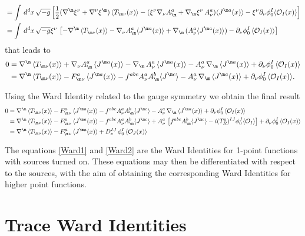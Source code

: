 \documentclass[a4paper,11pt,openright,twoside]{book}
\let\n=\nu      \let\x=\xi     \let\p=\pi      \let\r=\rho
\newcommand{\sdfrac}[2]{\mbox{\small$\displaystyle\frac{#1}{#2}$}}
\numberwithin{equation}{section}
\begin{document}
{{\begin{align}
	&=\int\,d^dx\,\sqrt{-g}\left[\sdfrac{1}{2}(\nabla^\m\x^\n+\nabla^\n\x^\m)\,\langle T_{\m\n}(x)\rangle-(\x^\n\nabla_\n A_\m^a+\nabla_\m\x^\n\,A_\n^a)\langle J^{\m a}(x)\rangle-\x^\n\partial_\n\phi_0^I\langle \mathcal{O}_I(x)\rangle\right]\notag\\
	&=\int\,d^dx\,\sqrt{-g}\x^\n\,\left[-\nabla^\m\,\langle T_{\m\n}(x)\rangle-\nabla_\n A_\m^a\langle J^{\m a}(x)\rangle+\nabla_\m\,(A_\n^a\langle J^{\m a}(x)\rangle)-\partial_\n\phi_0^I\,\langle \mathcal{O}_I(x)\rangle\right]
\end{align}
that leads to 
\begin{align}
	0&=\nabla^\m\,\langle T_{\m\n}(x)\rangle+\nabla_\n A_\m^a\,\langle J^{\m a}(x)\rangle-\nabla_\m\,A_\n^a\,\langle J^{\m a}(x)\rangle-A_\n^a\,\nabla_\m\,\langle J^{\m a}(x)\rangle+\partial_\n\phi_0^I\,\langle \mathcal{O}_I(x)\rangle\notag\\
	&=\nabla^\m\,\langle T_{\m\n}(x)\rangle-F_{\m\n}^a\,\langle J^{\m a}(x)\rangle-f^{abc}A_\n^a A_\m^b\langle J^{\m c}\rangle-A_\n^a\,\nabla_\m\,\langle J^{\m a}(x)\rangle+\partial_\n\phi_0^I\,\langle \mathcal{O}_I(x)\rangle.\label{Ward2}
\end{align}

Using the Ward Identity related to the gauge symmetry we obtain the final result 
\begin{align}
	0&=\nabla^\m\,\langle T_{\m\n}(x)\rangle-F_{\m\n}^a\,\langle J^{\m a}(x)\rangle-f^{abc}A_\n^a A_\m^b\langle J^{\m c}\rangle-A_\n^a\,\nabla_\m\,\langle J^{\m a}(x)\rangle+\partial_\n\phi_0^I\,\langle \mathcal{O}_I(x)\rangle\notag\\
	&=\nabla^\m\,\langle T_{\m\n}(x)\rangle-F_{\m\n}^a\,\langle J^{\m a}(x)\rangle-f^{abc}A_\n^a A_\m^b\langle J^{\m c}\rangle+A_\n^a\,\left[f^{abc}A_\m^b\langle J^{\m c}\rangle-i(T^a_R)^{IJ}\phi_0^J\langle\mathcal{O}_I\rangle\right]+\partial_\n\phi_0^I\,\langle \mathcal{O}_I(x)\rangle\notag\\
	&=\nabla^\m\,\langle T_{\m\n}(x)\rangle-F_{\m\n}^a\,\langle J^{\m a}(x)\rangle+D_\n^{IJ}\,\phi_0^I\,\langle \mathcal{O}_J(x)\rangle\label{transWardF}
\end{align}

The equations \eqref{Ward1} and \eqref{Ward2} are the Ward Identities for 1-point functions with sources turned on. These equations may then be differentiated with respect to the sources, with the aim of obtaining the corresponding Ward Identities for higher point functions. 

\section{Trace Ward Identities}

}}
\end{document}
